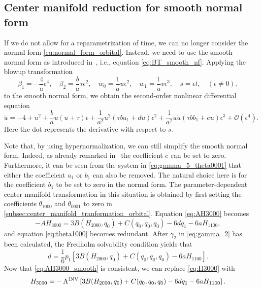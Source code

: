 \subsection{Center manifold reduction for smooth normal form} 
\label{sec:center-manifold-reduction-without-time-reparametrization}
If we do not allow for a reparametrization of time, we can no longer consider the
normal form \cref{eq:normal_form_orbital}. Instead, we need to use the smooth
normal form as introduced in~\cite{Gray-Scott2015}, i.e., equation
\cref{eq:BT_smooth_nf}. Applying the blowup transformation
\begin{equation}
\label{eq:blowup_smooth}				
\beta_1 = - \frac4a \epsilon^4, \quad 
\beta_2 = \frac b a \tau \epsilon^2, \quad 
w_0 = \frac1a u \epsilon^2, \quad
w_1 = \frac1a v \epsilon^3, \quad
s = \epsilon t, \quad (\epsilon \neq 0),
\end{equation}
to the smooth normal form, we obtain the second-order nonlinear differential
equation 
\begin{equation}
\label{eq:second_order_nonlinear_oscillator_smooth_normalform}
				\ddot u = -4 + u^2 + \frac ba \dot u \left( u + \tau \right)\epsilon 
				+ \frac1{a^2} u^2\left(\tau b a_1 + d u \right) \epsilon^2
        + \frac1{a^2} u\dot u \left( \tau b b_1 + e u \right) \epsilon^3
				+ \mathcal{O}(\epsilon^4).
\end{equation}
Here the dot represents the derivative with respect to $s$. 

Note that, by using hypernormalization, we can still simplify the smooth normal form.
Indeed, as already remarked in~\cite{Kuznetsov2005practical} the coefficient
$e$ can be set to zero.  Furthermore, it can be seen from the system in
\cref{eq:gamma_5_theta0001} that either the coefficient $a_1$ or $b_1$ can also
be removed. The natural choice here is for the coefficient $b_1$ to
be set to zero in the normal form. The parameter-dependent center manifold
transformation in this situation is obtained by first setting the coefficients
$\theta_{1000}$ and $\theta_{0001}$ to zero in
\cref{subsec:center_manifold_tranformation_orbital}. Equation \cref{eq:AH3000}
becomes
\begin{equation}
    \label{eq:AH3000_smooth}
    -A H_{3000} = 3 B(H_{2000},q_0) + C(q_0,q_0,q_0) - 6d q_1 - 6a H_{1100},
\end{equation}
and equation \cref{eq:theta1000} becomes redundant. After $\gamma_2$ in
\cref{eq:gamma_2} has been calculated, the Fredholm solvability condition yields
that
\begin{equation*}
    d = \frac16 p_1 \left[ 3B(H_{2000},q_0) + C(q_0,q_0,q_0)  - 6 a H_{1100}\right].
\end{equation*}
Now that \cref{eq:AH3000_smooth} is consistent, we can replace \cref{eq:H3000}
with
\begin{equation*}
	H_{3000} = -\operatorname{A^{\text{INV}}} \left[ 3B(H_{2000},q_0) + C(q_0,q_0,q_0) - 6dq_1 - 6a H_{1100} \right].
\end{equation*}

